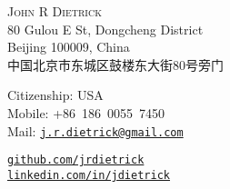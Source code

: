 \documentclass[10pt]{article}
\makeatletter
\def\spaceBetweenSections{\vspace{-10pt}}
\def\fullName{John R Dietrick}
\def\englishAddressLineOne{80 Gulou E St, Dongcheng District}
\def\englishAddressLineTwo{Beijing 100009, China}
\def\chineseAddress{中国北京市东城区鼓楼东大街80号旁门}
\def\citizenship{USA}
\def\mobileNumber{+86~186~0055~7450}
\def\emailAddress{j.r.dietrick@gmail.com}
\makeatother
\begin{document}
\begin{CJK}{UTF8}{gbsn}

\vspace{0pt}
\begin{center}
    \flushleft
    \begin{minipage}[b]{0.42\linewidth}
        \vspace{0pt}
        {\huge\textsc{\fullName}}\\
        \englishAddressLineOne\\
        \englishAddressLineTwo
        \ifx\USAVERSION\undefined
            \\\chineseAddress
        \fi
    \end{minipage}
    \begin{minipage}[b]{0.32\linewidth}
        \vspace{0pt}
        Citizenship: \citizenship\\
        Mobile: \mobileNumber\\
        Mail: \texttt{\small\href{mailto:\emailAddress}{\emailAddress}}
    \end{minipage}
    \begin{minipage}[b]{0.24\linewidth}
        \vspace{0pt}
        \texttt{\small\href{https://github.com/jrdietrick}{github.com/jrdietrick}}\\
        \texttt{\small\href{https://linkedin.com/in/jdietrick}{linkedin.com/in/jdietrick}}
    \end{minipage}
\end{center}

\spaceBetweenSections


\end{CJK}
\end{document}
